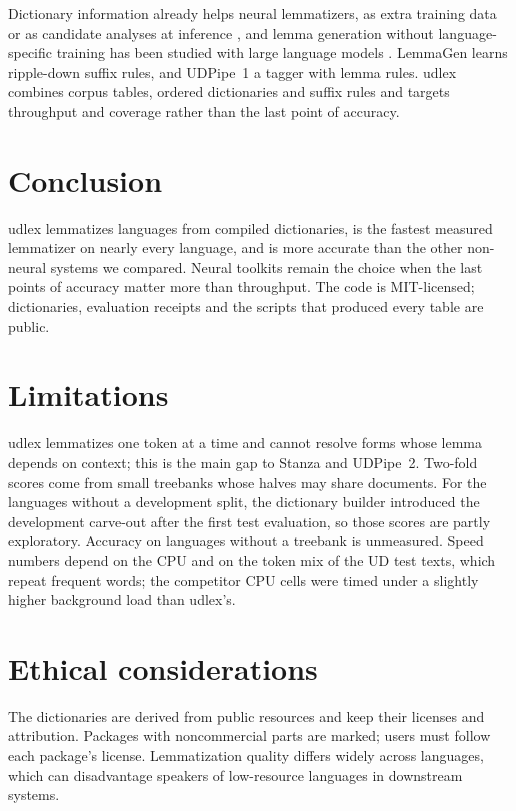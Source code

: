 \documentclass[11pt]{article}
\begin{document}
Dictionary information already helps neural lemmatizers, as extra training
data \citep{bergmanis-goldwater-2019-data} or as candidate analyses at
inference \citep{milintsevich-sirts-2021-enhancing}, and lemma generation
without language-specific training has been studied with large language models
\citep{toporkov-etal-2025-lemma}. LemmaGen \citep{jursic-etal-2010-lemmagen}
learns ripple-down suffix rules, and UDPipe~1 \citep{straka-strakova-2017-tokenizing}
a tagger with lemma rules. udlex combines corpus tables, ordered dictionaries
and suffix rules and targets throughput and coverage rather than the last
point of accuracy.

\section{Conclusion}

udlex lemmatizes \relLangs{} languages from compiled dictionaries, is the
fastest measured lemmatizer on nearly every language, and is more accurate
than the other non-neural systems we compared. Neural toolkits remain the
choice when the last points of accuracy matter more than throughput. The
code is MIT-licensed; dictionaries, evaluation receipts and the scripts that
produced every table are public.

\section*{Limitations}

udlex lemmatizes one token at a time and cannot resolve forms whose lemma
depends on context; this is the main gap to Stanza and UDPipe~2. Two-fold
scores come from small treebanks whose halves may share documents. For the
languages without a development split, the dictionary builder introduced the
development carve-out after the first test evaluation, so those scores are
partly exploratory. Accuracy on languages without a treebank is unmeasured.
Speed numbers depend on the CPU and on the token mix of the UD test texts,
which repeat frequent words; the competitor CPU cells were timed under a
slightly higher background load than udlex's.

\section*{Ethical considerations}

The dictionaries are derived from public resources and keep their licenses
and attribution. Packages with noncommercial parts are marked; users must
follow each package's license. Lemmatization quality differs widely across
languages, which can disadvantage speakers of low-resource languages in
downstream systems.


\end{document}
